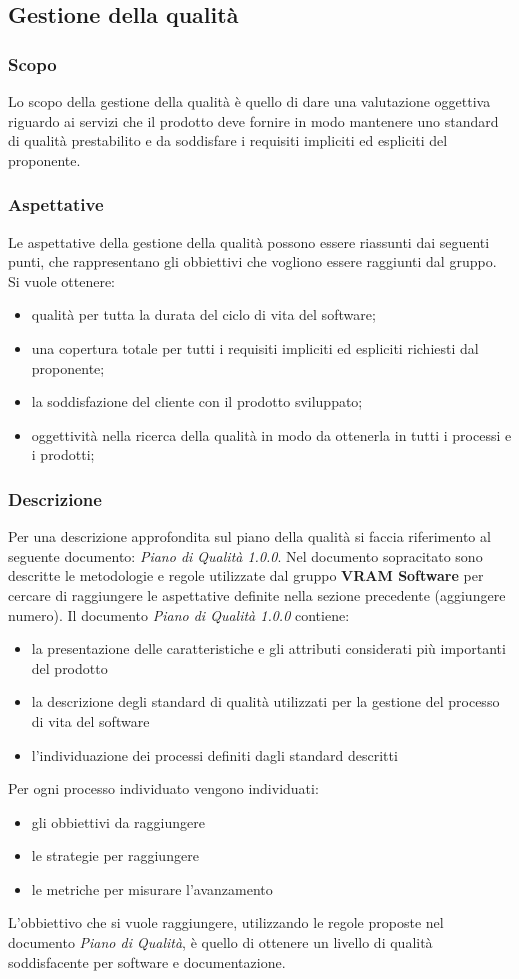 \subsection{Gestione della qualità}
\subsubsection{Scopo}
Lo scopo della gestione della qualità è quello di dare una valutazione oggettiva riguardo ai servizi che il prodotto deve fornire in modo mantenere uno standard di qualità prestabilito e da soddisfare i requisiti impliciti ed espliciti del proponente.
\subsubsection{Aspettative}
Le aspettative della gestione della qualità possono essere riassunti dai seguenti punti, che rappresentano gli obbiettivi che vogliono essere raggiunti dal gruppo. Si vuole ottenere:
\begin{itemize}
	\item qualità per tutta la durata del ciclo di vita del software;
	\item una copertura totale per tutti i requisiti impliciti ed espliciti richiesti dal proponente;
	\item la soddisfazione del cliente con il prodotto sviluppato;
	\item oggettività nella ricerca della qualità in modo da ottenerla in tutti i processi e i prodotti;
\end{itemize}
\subsubsection{Descrizione}
Per una descrizione approfondita sul piano della qualità si faccia riferimento al seguente documento: \textit{Piano di Qualità 1.0.0}.
Nel documento sopracitato sono descritte le metodologie e regole utilizzate dal gruppo \textbf{VRAM Software} per cercare di raggiungere le aspettative definite nella sezione precedente (aggiungere numero).
Il documento \textit{Piano di Qualità 1.0.0} contiene:
\begin{itemize}
	\item la presentazione delle caratteristiche e gli attributi considerati più importanti del prodotto
	\item la descrizione degli standard di qualità utilizzati per la gestione del processo di vita del software
	\item l'individuazione dei processi definiti dagli standard descritti
\end{itemize}
Per ogni processo individuato vengono individuati:
\begin{itemize}
	\item gli obbiettivi da raggiungere
	\item le strategie per raggiungere
	\item le metriche per misurare l'avanzamento
\end{itemize}
L'obbiettivo che si vuole raggiungere, utilizzando le regole proposte nel documento \textit{Piano di Qualità}, è quello di ottenere un livello di qualità soddisfacente per software e documentazione.
